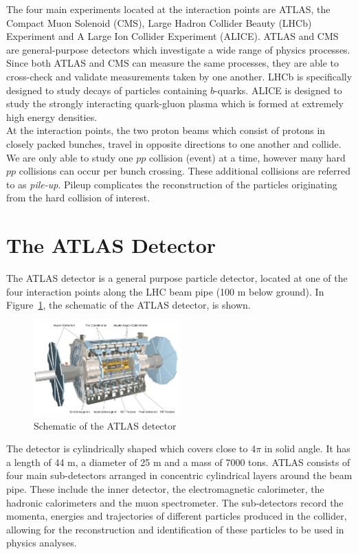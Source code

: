 The four main experiments located at the interaction points are ATLAS, the Compact Muon Solenoid (CMS), Large Hadron Collider Beauty (LHCb) Experiment and A Large Ion Collider Experiment (ALICE). ATLAS and CMS are general-purpose detectors which investigate a wide range of physics processes. Since both ATLAS and CMS can measure the same processes, they are able to cross-check and validate measurements taken by one another. LHCb is specifically designed to study decays of particles containing $b$-quarks. ALICE is designed to study the strongly interacting quark-gluon plasma which is formed at extremely high energy densities.\\

At the interaction points, the two proton beams which consist of protons in closely packed bunches, travel in opposite directions to one another and collide. We are only able to study one $pp$ collision (event) at a time, however many hard $pp$ collisions can occur per bunch crossing. These additional collisions are referred to as \textit{pile-up}. Pileup complicates the reconstruction of the particles originating from the hard collision of interest. 



\section{The ATLAS Detector}
The ATLAS detector is a general purpose particle detector, located at one of the four interaction points along the LHC beam pipe (100 m below ground). In Figure~\ref{fig:atlas-detector}, the schematic of the ATLAS detector, is shown.


\begin{figure}[h!]
 \includegraphics[width=0.5\textwidth]{figures/theoryFigs/atlasDetector.png}
 \centering
\caption{Schematic of the ATLAS detector~\cite{Collaboration_2008}}
\label{fig:atlas-detector}
\end{figure}


The detector is cylindrically shaped which covers close to 4$\pi$ in solid angle. It has a length of 44 m, a diameter of 25 m and a mass of 7000 tons. ATLAS consists of four main sub-detectors arranged in concentric cylindrical layers around the beam pipe. These include the inner detector, the electromagnetic calorimeter, the hadronic calorimeters and the muon spectrometer. The sub-detectors record the momenta, energies and trajectories of different particles produced in the collider, allowing for the reconstruction and identification of these particles to be used in physics analyses.

